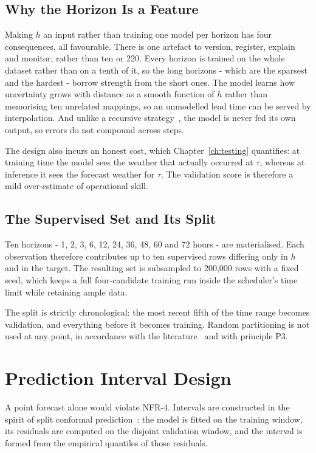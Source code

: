 \subsection{Why the Horizon Is a Feature}
Making $h$ an input rather than training one model per horizon has four
consequences, all favourable. There is one artefact to version, register, explain
and monitor, rather than ten or 220. Every horizon is trained on the whole
dataset rather than on a tenth of it, so the long horizons - which are the
sparsest and the hardest - borrow strength from the short ones. The model learns
how uncertainty grows with distance as a smooth function of $h$ rather than
memorising ten unrelated mappings, so an unmodelled lead time can be served by
interpolation. And unlike a recursive strategy~\cite{ref:multistep}, the model is
never fed its own output, so errors do not compound across steps.

The design also incurs an honest cost, which Chapter~\ref{ch:testing} quantifies:
at training time the model sees the weather that actually occurred at $\tau$,
whereas at inference it sees the forecast weather for $\tau$. The validation
score is therefore a mild over-estimate of operational skill.

\subsection{The Supervised Set and Its Split}
Ten horizons - 1, 2, 3, 6, 12, 24, 36, 48, 60 and 72 hours - are materialised.
Each observation therefore contributes up to ten supervised rows differing only
in $h$ and in the target. The resulting set is subsampled to 200,000 rows with a
fixed seed, which keeps a full four-candidate training run inside the scheduler's
time limit while retaining ample data.

The split is strictly chronological: the most recent fifth of the time range
becomes validation, and everything before it becomes training. Random
partitioning is not used at any point, in accordance with the
literature~\cite{ref:bergmeir} and with principle P3.

\section{Prediction Interval Design}
\label{sec:design-intervals}
A point forecast alone would violate NFR-4. Intervals are constructed in the
spirit of split conformal prediction~\cite{ref:inductive,ref:leiconformal}: the
model is fitted on the training window, its residuals are computed on the
disjoint validation window, and the interval is formed from the empirical
quantiles of those residuals.

